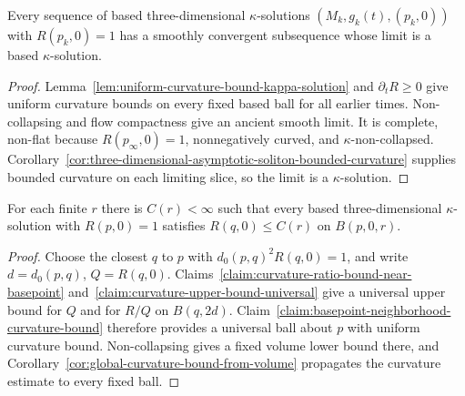 \begin{theorem}\label{thm:kappa-solution-compactness}
\label{compactkappa}

Every sequence of based three-dimensional $\kappa$-solutions
$(M_k,g_k(t),(p_k,0))$ with $R(p_k,0)=1$ has a smoothly convergent
subsequence whose limit is a based $\kappa$-solution.
\end{theorem}
\begin{proof}
\sketch
{}
Lemma~\ref{lem:uniform-curvature-bound-kappa-solution} and
$\partial_tR\geq0$ give uniform curvature bounds on every fixed
based ball for all earlier times. Non-collapsing and flow compactness
give an ancient smooth limit. It is complete, non-flat because
$R(p_\infty,0)=1$, nonnegatively curved, and $\kappa$-non-collapsed.
Corollary~\ref{cor:three-dimensional-asymptotic-soliton-bounded-curvature}
supplies bounded curvature on each limiting slice, so the limit is
a $\kappa$-solution.
\end{proof}

\begin{lemma}\label{lem:uniform-curvature-bound-kappa-solution}
\label{proposition}

For each finite $r$ there is $C(r)<\infty$ such that every based
three-dimensional $\kappa$-solution with $R(p,0)=1$ satisfies
$R(q,0)\leq C(r)$ on $B(p,0,r)$.
\end{lemma}
\begin{proof}
\sketch

Choose the closest $q$ to $p$ with
$d_0(p,q)^2R(q,0)=1$, and write $d=d_0(p,q)$,
$Q=R(q,0)$. Claims~\ref{claim:curvature-ratio-bound-near-basepoint}
and~\ref{claim:curvature-upper-bound-universal} give a universal
upper bound for $Q$ and for $R/Q$ on $B(q,2d)$.
Claim~\ref{claim:basepoint-neighborhood-curvature-bound} therefore
provides a universal ball about $p$ with uniform curvature bound.
Non-collapsing gives a fixed volume lower bound there, and
Corollary~\ref{cor:global-curvature-bound-from-volume} propagates
the curvature estimate to every fixed ball.
\end{proof}

